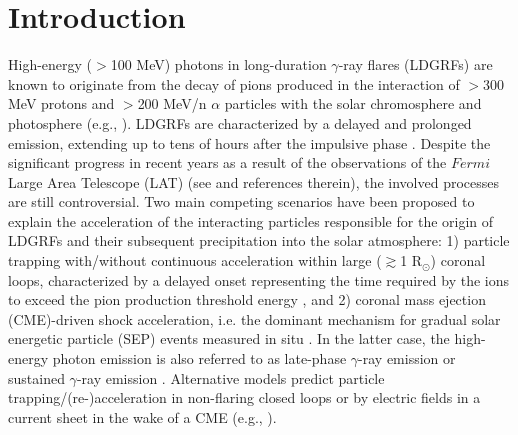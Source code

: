 \documentclass{aastex61}
\begin{document}
%
%
%
%

\section{Introduction}\label{Introduction}
High-energy ($>$100 MeV) photons in
long-duration $\gamma$-ray flares (LDGRFs) are known to originate from the decay of pions produced in the interaction of $>$300 MeV protons and $>$200 MeV/n $\alpha$ particles with the solar chromosphere and photosphere (e.g., \citealp{ref:VILMER2011}).
LDGRFs are characterized by a delayed and prolonged emission, extending up to tens of hours after the impulsive phase \citep{ref:RYAN2000}. Despite the significant progress in recent years as a result of the observations of the $Fermi$ Large Area Telescope (LAT) (see \citealp{ref:AJELLO2021} and references therein), the
involved processes are still controversial.
Two main competing scenarios have been proposed to explain
the acceleration of the interacting particles responsible for 
the origin of LDGRFs and their subsequent precipitation into the solar atmosphere:
1) particle trapping with/without continuous acceleration within large ($\gtrsim$1 R$_{\odot}$) coronal loops, characterized by a delayed onset representing the time required by the ions to exceed the pion production threshold energy \citep{ref:RYANLEE1991,ref:MANDZHAVIDZERAMATY1992,ref:CHUPPRYAN2009,ref:GRECHNEV2018,ref:RYAN2018,ref:DENOLFO2019,ref:RYAN2019,ref:DENOLFO2021}, and 2) coronal mass ejection (CME)-driven shock acceleration, i.e. the dominant mechanism for gradual solar energetic particle (SEP) events measured in situ
\citep{ref:WILD1963,ref:RAMATY1987,ref:CLIVER1993,ref:KOCHAROV2015,ref:PESCE2015,ref:PLOTNIKOV2017,ref:JIN2018,ref:KAHLER2018,ref:GOPALSWAMY2018,ref:KOULOUMVAKOS2020}. In the latter case, the high-energy photon emission is also referred to as late-phase $\gamma$-ray emission \citep{ref:SHARE2018} or sustained $\gamma$-ray emission \citep{ref:KAHLER2018}.
Alternative models predict particle trapping/(re-)acceleration in non-flaring closed loops \citep{ref:HUDSON2018} or by electric fields in a current sheet in the wake of a CME (e.g., \citealp{ref:AKIMOV1996,ref:KOCHAROV2020}). 
\end{document}
